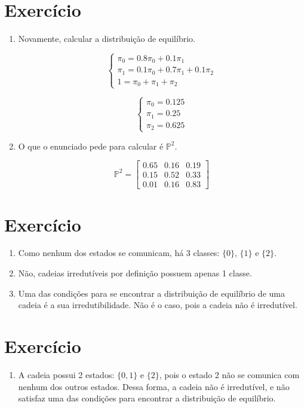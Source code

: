 \documentclass{article}
\begin{document}
\section{Exercício}

\begin{enumerate}[label=(\alph*)]
    \item Novamente, calcular a distribuição de equilíbrio.
    
    $$\begin{cases}
      \pi_0 = 0.8\pi_0+0.1\pi_1\\
      \pi_1 = 0.1\pi_0+0.7\pi_1+0.1\pi_2\\
      1 = \pi_0 + \pi_1 + \pi_2
    \end{cases}$$
    
    $$\begin{cases}
      \pi_0 = 0.125\\
      \pi_1 = 0.25\\
      \pi_2 = 0.625
    \end{cases}$$
    
    \newpage
    
    \item O que o enunciado pede para calcular é $\mathbb{P}^2$.
    
    $$\mathbb{P}^2=\begin{bmatrix}
        0.65 & 0.16 & 0.19\\
        0.15 & 0.52 & 0.33\\
        0.01 & 0.16 & 0.83
    \end{bmatrix}$$

\end{enumerate}

\section{Exercício}

\begin{enumerate}[label=(\alph*)]
    \item Como nenhum dos estados se comunicam, há 3 classes: $\{0\}$, $\{1\}$ e $\{2\}$.
    \item Não, cadeias irredutíveis por definição possuem apenas 1 classe.
    \item Uma das condições para se encontrar a distribuição de equilíbrio de uma cadeia é a sua irredutibilidade. Não é o caso, pois a cadeia não é irredutível.

\end{enumerate}

\section{Exercício}

\begin{enumerate}
    \item[] A cadeia possui 2 estados: $\{0,1\}$ e $\{2\}$, pois o estado 2 não se comunica com nenhum dos outros estados. Dessa forma, a cadeia não é irredutível, e não satisfaz uma das condições para encontrar a distribuição de equilíbrio.

\end{enumerate}
\end{document}
